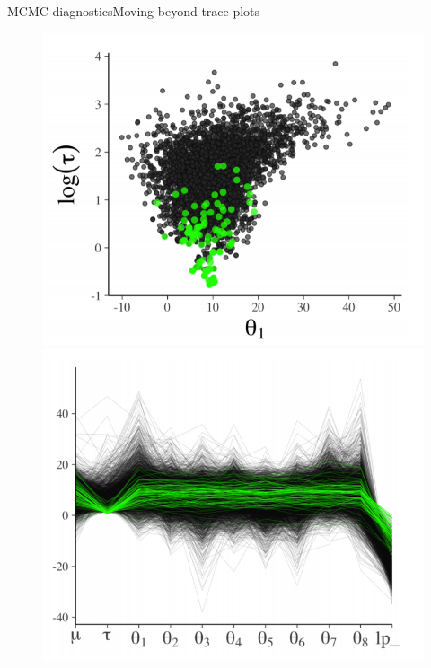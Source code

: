 \documentclass{beamer}
\begin{document}
	\begin{frame}{MCMC diagnostics}{Moving beyond trace plots}
		\begin{figure}
			\centering
			\begin{minipage}{.5\textwidth}
				\centering
				\includegraphics[width=1.0\linewidth]{images/scatterplot.png}
			\end{minipage}\hfill
			\begin{minipage}{.5\textwidth}
				\centering
				\includegraphics[width=1.0\linewidth]{images/coplot.png}
			\end{minipage}
		\end{figure}
	\end{frame}
	
\end{document}
